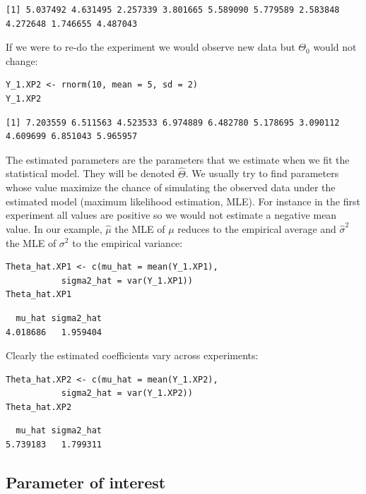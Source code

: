 \documentclass[12pt]{article}
\begin{document}
\begin{verbatim}
[1] 5.037492 4.631495 2.257339 3.801665 5.589090 5.779589 2.583848 4.272648 1.746655 4.487043
\end{verbatim}

If we were to re-do the experiment we would observe new data but \(\Theta_0\) would not change:
\lstset{language=r,label= ,caption= ,captionpos=b,numbers=none}
\begin{lstlisting}
Y_1.XP2 <- rnorm(10, mean = 5, sd = 2)
Y_1.XP2
\end{lstlisting}

\begin{verbatim}
[1] 7.203559 6.511563 4.523533 6.974889 6.482780 5.178695 3.090112 4.609699 6.851043 5.965957
\end{verbatim}

The estimated parameters are the parameters that we estimate when we
fit the statistical model. They will be denoted \(\hat{\Theta}\). We
usually try to find parameters whose value maximize the chance of
simulating the observed data under the estimated model (maximum
likelihood estimation, MLE). For instance in the first experiment all
values are positive so we would not estimate a negative mean value. In
our example, \(\hat{\mu}\) the MLE of \(\mu\) reduces to the empirical
average and \(\hat{\sigma}^2\) the MLE of \(\sigma^2\) to the
empirical variance:
\lstset{language=r,label= ,caption= ,captionpos=b,numbers=none}
\begin{lstlisting}
Theta_hat.XP1 <- c(mu_hat = mean(Y_1.XP1),
		   sigma2_hat = var(Y_1.XP1))
Theta_hat.XP1
\end{lstlisting}

\begin{verbatim}
  mu_hat sigma2_hat 
4.018686   1.959404
\end{verbatim}

Clearly the estimated coefficients vary across experiments:
\lstset{language=r,label= ,caption= ,captionpos=b,numbers=none}
\begin{lstlisting}
Theta_hat.XP2 <- c(mu_hat = mean(Y_1.XP2),
		   sigma2_hat = var(Y_1.XP2))
Theta_hat.XP2
\end{lstlisting}

\begin{verbatim}
  mu_hat sigma2_hat 
5.739183   1.799311
\end{verbatim}

\subsection{Parameter of interest}
\label{sec:orgc426920}
\end{document}
